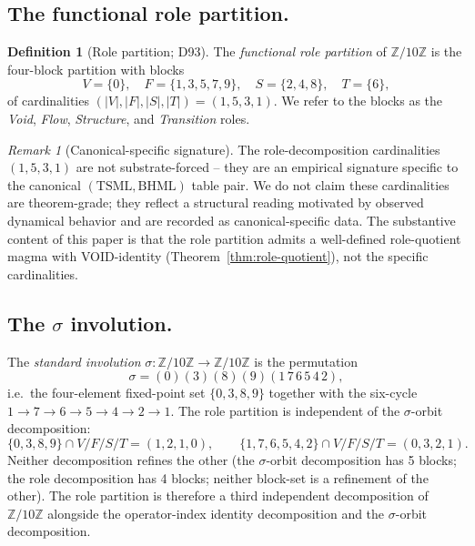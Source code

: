 \documentclass[11pt,reqno]{amsart}
\theoremstyle{plain}
\theoremstyle{definition}
\newtheorem{definition}[theorem]{Definition}
\theoremstyle{remark}
\newtheorem*{remark}{Remark}
\newcommand{\Z}{\mathbb{Z}}
\newcommand{\TS}{\mathrm{TSML}}
\newcommand{\BH}{\mathrm{BHML}}
\begin{document}
\subsection{The functional role partition.}

\begin{definition}[Role partition; D93] \label{def:roles}
The \emph{functional role partition} of $\Z/10\Z$ is the four-block
partition with blocks
\[
V = \{0\}, \quad
F = \{1, 3, 5, 7, 9\}, \quad
S = \{2, 4, 8\}, \quad
T = \{6\},
\]
of cardinalities $(|V|, |F|, |S|, |T|) = (1, 5, 3, 1)$. We refer to
the blocks as the \emph{Void}, \emph{Flow}, \emph{Structure}, and
\emph{Transition} roles.
\end{definition}

\begin{remark}[Canonical-specific signature]
The role-decomposition cardinalities $(1, 5, 3, 1)$ are not
substrate-forced -- they are an empirical signature specific to the
canonical $(\TS, \BH)$ table pair. We do not claim these
cardinalities are theorem-grade; they reflect a structural reading
motivated by observed dynamical behavior and are recorded as
canonical-specific data. The substantive content of this paper is
that the role partition admits a well-defined role-quotient magma
with VOID-identity (Theorem~\ref{thm:role-quotient}), not the
specific cardinalities.
\end{remark}

\subsection{The $\sigma$ involution.} \label{ssec:sigma}

The \emph{standard involution} $\sigma : \Z/10\Z \to \Z/10\Z$ is the
permutation
\[
\sigma = (0)(3)(8)(9)(1\, 7\, 6\, 5\, 4\, 2),
\]
i.e.\ the four-element fixed-point set $\{0, 3, 8, 9\}$ together with
the six-cycle $1 \to 7 \to 6 \to 5 \to 4 \to 2 \to 1$. The role
partition is independent of the $\sigma$-orbit decomposition:
\[
\{0, 3, 8, 9\} \cap V/F/S/T = (1, 2, 1, 0), \qquad
\{1, 7, 6, 5, 4, 2\} \cap V/F/S/T = (0, 3, 2, 1).
\]
Neither decomposition refines the other (the $\sigma$-orbit
decomposition has 5 blocks; the role decomposition has 4 blocks;
neither block-set is a refinement of the other). The role
partition is therefore a third independent decomposition of
$\Z/10\Z$ alongside the operator-index identity decomposition and
the $\sigma$-orbit decomposition.

\end{document}
